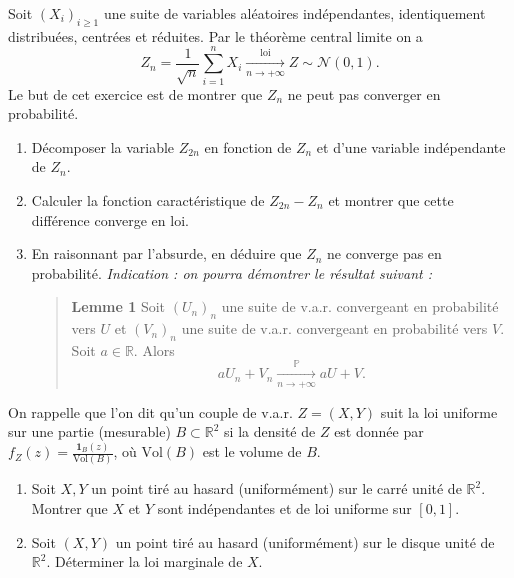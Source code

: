 \smallskip

\begin{mdframed}
\begin{exercice}
Soit $(X_i)_{i \ge 1}$ une suite de variables aléatoires indépendantes, identiquement distribuées, centrées et réduites. Par le théorème central limite on a
\begin{equation*}
Z_n = \frac{1}{\sqrt{n}} \sum_{i=1}^n X_i \xrightarrow[n \to +\infty]{\text{loi}} Z \sim \mathcal{N}(0, 1).
\end{equation*}
Le but de cet exercice est de montrer que $Z_n$ ne peut pas converger en probabilité.
\begin{enumerate}
    \item Décomposer la variable $Z_{2n}$ en fonction de $Z_n$ et d'une variable indépendante de $Z_n$.
    \item Calculer la fonction caractéristique de $Z_{2n} - Z_n$ et montrer que cette différence converge en loi.
    \item En raisonnant par l'absurde, en déduire que $Z_n$ ne converge pas en probabilité. \textit{Indication : on pourra démontrer le résultat suivant : }
    \begin{quote}
    \textbf{Lemme 1} Soit $(U_n)_n$ une suite de v.a.r. convergeant en probabilité vers $U$ et $(V_n)_n$ une suite de v.a.r. convergeant en probabilité vers $V$. Soit $a \in \mathbb{R}$. Alors
    \begin{equation*}
    aU_n + V_n \xrightarrow[n \to +\infty]{\mathbb{P}} aU + V.
    \end{equation*}
    \end{quote}
\end{enumerate}
\end{exercice}
\end{mdframed}

\smallskip

\begin{mdframed}
\begin{exercice}
On rappelle que l'on dit qu'un couple de v.a.r. $Z = (X, Y)$ suit la loi uniforme sur une partie (mesurable) $B \subset \mathbb{R}^2$ si la densité de $Z$ est donnée par $f_Z(z) = \frac{\mathbf{1}_B(z)}{\text{Vol}(B)}$, où $\text{Vol}(B)$ est le volume de $B$.
\begin{enumerate}
    \item Soit $X, Y$ un point tiré au hasard (uniformément) sur le carré unité de $\mathbb{R}^2$. Montrer que $X$ et $Y$ sont indépendantes et de loi uniforme sur $[0, 1]$.
    \item Soit $(X, Y)$ un point tiré au hasard (uniformément) sur le disque unité de $\mathbb{R}^2$. Déterminer la loi marginale de $X$.
\end{enumerate}
\end{exercice}
\end{mdframed}

